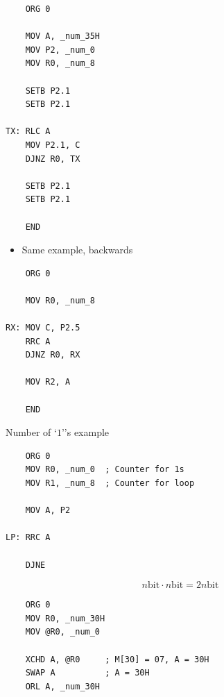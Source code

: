 \documentclass[12pt]{article}
\begin{document}
\begin{verbatim}
    ORG 0

    MOV A, _num_35H
    MOV P2, _num_0
    MOV R0, _num_8

    SETB P2.1
    SETB P2.1

TX: RLC A
    MOV P2.1, C
    DJNZ R0, TX

    SETB P2.1
    SETB P2.1

    END
\end{verbatim}

\begin{itemize}
    \item Same example, backwards
\end{itemize}

\begin{verbatim}
    ORG 0

    MOV R0, _num_8

RX: MOV C, P2.5
    RRC A
    DJNZ R0, RX

    MOV R2, A

    END
\end{verbatim}

 \begin{itemize}
    Number of `$1$''s example
 \end{itemize}

\begin{verbatim}
    ORG 0
    MOV R0, _num_0  ; Counter for 1s
    MOV R1, _num_8  ; Counter for loop

    MOV A, P2

LP: RRC A

    DJNE
\end{verbatim}


\begin{equation}
    n \text{bit} \cdot n \text{bit} = 2n \text{bit}
\end{equation}

\begin{verbatim}
    ORG 0
    MOV R0, _num_30H
    MOV @R0, _num_0

    XCHD A, @R0     ; M[30] = 07, A = 30H
    SWAP A          ; A = 30H
    ORL A, _num_30H
\end{verbatim}
\end{document}
